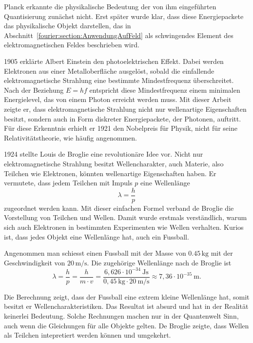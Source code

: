 Planck erkannte die physikalische Bedeutung der von ihm eingeführten Quantisierung zunächst nicht. 
Erst später wurde klar, dass diese Energiepackete das physikalische Objekt darstellen, das in Abschnitt~\ref{fourier:section:AnwendungAufFeld} als schwingendes Element des elektromagnetischen Feldes beschrieben wird.


1905 erklärte Albert Einstein den photoelektrischen Effekt. 
%
%
Dabei werden Elektronen aus einer Metalloberfläche ausgelöst, sobald die einfallende elektromagnetische Strahlung eine bestimmte Mindestfrequenz überschreitet. 
Nach der Beziehung $E = hf$ entspricht diese Mindestfrequenz einem minimalen Energielevel, das von einem Photon erreicht werden muss.
Mit dieser Arbeit zeigte er, dass elektromagnetische Strahlung nicht nur wellenartige Eigenschaften besitzt, sondern auch in Form diskreter Energiepackete, der Photonen, auftritt. 
Für diese Erkenntnis erhielt er 1921 den Nobelpreis für Physik, nicht für seine Relativitätstheorie, wie häufig angenommen.
%



1924 stellte Louis de Broglie eine revolutionäre Idee vor.
%
Nicht nur elektromagnetische Strahlung besitzt Wellencharakter, auch Materie, also Teilchen wie Elektronen, könnten wellenartige Eigenschaften haben.
Er vermutete, dass jedem Teilchen mit Impuls $p$ eine Wellenlänge
\begin{equation}
	\lambda = \frac{h}{p}
\end{equation}	
zugeordnet werden kann.
Mit dieser einfachen Formel verband de Broglie die Vorstellung von Teilchen und Wellen. Damit wurde erstmals verständlich, warum sich auch Elektronen in bestimmten Experimenten wie Wellen verhalten.
Kurios ist, dass jedes Objekt eine Wellenlänge hat, auch ein Fussball.


\begin{beispiel}
Angenommen man schiesst einen Fussball mit der Masse von $0.45\,\text{kg}$
mit der Geschwindigkeit von $20\,\text{m/s}$.
Die zugehörige Wellenlänge nach de Broglie ist 
\begin{equation}
	\lambda = \frac{h}{p} = \frac{h}{m \cdot v} = 	\frac{6{,}626 \cdot 10^{-34} \ \text{Js}}{0{,}45 \ \text{kg} \cdot 20 \ \text{m/s}} \approx 7{,}36 \cdot 10^{-35} \ \text{m}.
\end{equation}	

Die Berechnung zeigt, dass der Fussball eine extrem kleine Wellenlänge hat, somit besitzt er Wellencharakteristiken.
Das Resultat ist absurd und hat in der Realität keinerlei Bedeutung.
Solche Rechnungen machen nur in der Quantenwelt Sinn, auch wenn die Gleichungen für alle Objekte gelten. 
De Broglie zeigte, dass Wellen als Teilchen intepretiert werden können und umgekehrt. 
\end{beispiel}


